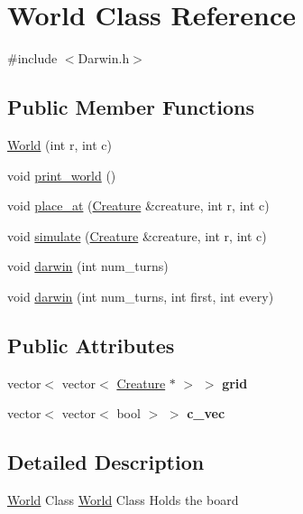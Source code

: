 \hypertarget{classWorld}{\section{\-World \-Class \-Reference}
\label{classWorld}
}


{\ttfamily \#include $<$\-Darwin.\-h$>$}

\subsection*{\-Public \-Member \-Functions}
\begin{DoxyCompactItemize}
\item 
\hyperlink{classWorld_a0a6508ab2deaf638d0bf287b4d15cdfb}{\-World} (int r, int c)
\item 
void \hyperlink{classWorld_aec5199d8bcd9cb193215b8ed23f1f08f}{print\-\_\-world} ()
\item 
void \hyperlink{classWorld_ab856bfd692b0b641ec765e422682d1ed}{place\-\_\-at} (\hyperlink{classCreature}{\-Creature} \&creature, int r, int c)
\item 
void \hyperlink{classWorld_a4e86e3f9e593b29bf76d760b8081535c}{simulate} (\hyperlink{classCreature}{\-Creature} \&creature, int r, int c)
\item 
void \hyperlink{classWorld_aafac24ada3eb2f0f4e15cf8df58289b1}{darwin} (int num\-\_\-turns)
\item 
void \hyperlink{classWorld_ae5e51168c1f8fcf7eaac52bf01dd3f9d}{darwin} (int num\-\_\-turns, int first, int every)
\end{DoxyCompactItemize}
\subsection*{\-Public \-Attributes}
\begin{DoxyCompactItemize}
\item 
\hypertarget{classWorld_a8a8a12572e50b5e937df9d46693f935e}{vector$<$ vector$<$ \hyperlink{classCreature}{\-Creature} $\ast$ $>$ $>$ {\bfseries grid}}\label{classWorld_a8a8a12572e50b5e937df9d46693f935e}

\item 
\hypertarget{classWorld_a73ae6e66cee12735cb6d378545b7df5a}{vector$<$ vector$<$ bool $>$ $>$ {\bfseries c\-\_\-vec}}\label{classWorld_a73ae6e66cee12735cb6d378545b7df5a}

\end{DoxyCompactItemize}


\subsection{\-Detailed \-Description}
\hyperlink{classWorld}{\-World} \-Class \hyperlink{classWorld}{\-World} \-Class \-Holds the board 

